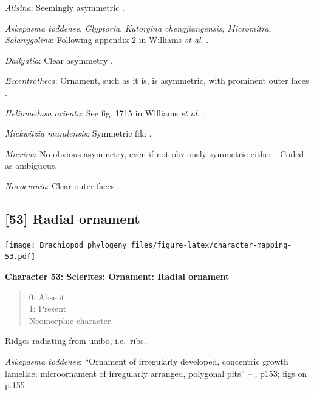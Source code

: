 \documentclass[openany]{book}
\theoremstyle{definition}
\theoremstyle{definition}
\theoremstyle{definition}
\theoremstyle{remark}
\begin{document}
\hypertarget{Alisina-coding-52}{}
\emph{Alisina}: Seemingly asymmetric \citetext{\citealp[fig.
122.3c]{Williams2000LinguliformeaCraniiformea}; \citealp[Fig.
1]{Zhang2011Anobolellate}}.

\hypertarget{Askepasma_toddense-coding-52}{}
\emph{Askepasma toddense}, \emph{Glyptoria}, \emph{Kutorgina
chengjiangensis}, \emph{Micromitra}, \emph{Salanygolina}: Following
appendix 2 in Williams \emph{et al}.
\citeyearpar{Williams1998Thediversity}.

\hypertarget{Dailyatia-coding-52}{}
\emph{Dailyatia}: Clear asymmetry \citep{Skovsted2015Theearly}.

\hypertarget{Eccentrotheca-coding-52}{}
\emph{Eccentrotheca}: Ornament, such as it is, is asymmetric, with
prominent outer faces \citep{Skovsted2011Scleritomeconstruction}.

\hypertarget{Heliomedusa_orienta-coding-52}{}
\emph{Heliomedusa orienta}: See fig. 1715 in Williams \emph{et al}.
\citeyearpar{Williams2007Supplement}.

\hypertarget{Mickwitzia_muralensis-coding-52}{}
\emph{Mickwitzia muralensis}: Symmetric fila
\citep{Balthasar2004Shellstructure}.

\hypertarget{Micrina-coding-52}{}
\emph{Micrina}: No obvious asymmetry, even if not obviously symmetric
either \citep{Holmer2008TheEarly}. Coded as ambiguous.

\hypertarget{Novocrania-coding-52}{}
\emph{Novocrania}: Clear outer faces \citep[fig.
100.2b]{Williams2000LinguliformeaCraniiformea}.

\subsection*{{[}53{]} Radial ornament}\label{radial-ornament}

\texttt{[image: Brachiopod\_phylogeny\_files/figure-latex/character-mapping-53.pdf]}

\textbf{Character 53: Sclerites: Ornament: Radial ornament}

\begin{quote}
0: Absent\\
1: Present\\
Neomorphic character.
\end{quote}

Ridges radiating from umbo, i.e.~ribs.

\hypertarget{Askepasma_toddense-coding-53}{}
\emph{Askepasma toddense}: ``Ornament of irregularly developed,
concentric growth lamellae; microornament of irregularly arranged,
polygonal pits'' -- \citet{Williams2000LinguliformeaCraniiformea}, p153;
figs on p.155.
\end{document}
